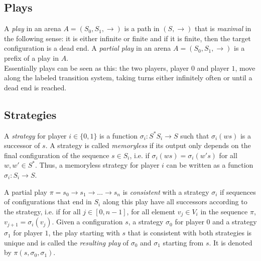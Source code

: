 \subsection{Plays}

\noindent
%
A {\em play} in an arena $A=(S_0,S_1,\rightarrow)$ is a path in $(S,{\rightarrow})$ that is {\em maximal} in the following sense: it is either infinite or finite and if it is finite, then the target configuration is a dead end. 
A {\em partial play} in an arena $A=(S_0,S_1,\rightarrow)$ is a 
prefix of a play in $A$.\\

\noindent
Essentially plays can be seen as this: the two players, player $0$ and player $1$, move along the labeled transition system, taking turns either inﬁnitely often or until a dead end is reached.

\subsection{Strategies}


A {\em strategy} for player $i \in \{ 0,1\}$ is a function $\sigma_i : S^* S_i \to S$ such
that $\sigma_i(ws)$ is a successor of $s$.
%
A strategy is called {\em memoryless} if its output only depends on the final configuration of the sequence $s \in S_i$, i.e. if $\sigma_i(ws) = \sigma_i(w's)$ for all $w,w' \in S^*$. Thus, a memoryless strategy for player $i$ can be written  as a function $\sigma_i: S_i \to S$.

A partial play $\pi = s_0 \rightarrow s_1 \rightarrow \ldots \rightarrow s_n$ is {\em consistent} with a strategy $\sigma_i$ if sequences of configurations that end in $S_i$ along this play have all successors according to the strategy, i.e.
if for all $j\in[0,n-1]$, for all element $v_j \in V_i$ in the sequence $\pi$,
$v_{j+1} = \sigma_i(v_j)$.
 Given a configuration $s$,   a strategy $\sigma_0$ for player $0$ and a strategy $\sigma_1$ for player $1$, the play starting with $s$ that is consistent with both strategies is unique and is called the {\em resulting play} of $\sigma_0$ and $\sigma_1$ starting from $s$. It is 
denoted by $\pi(s, \sigma_0, \sigma_1)$.\\



